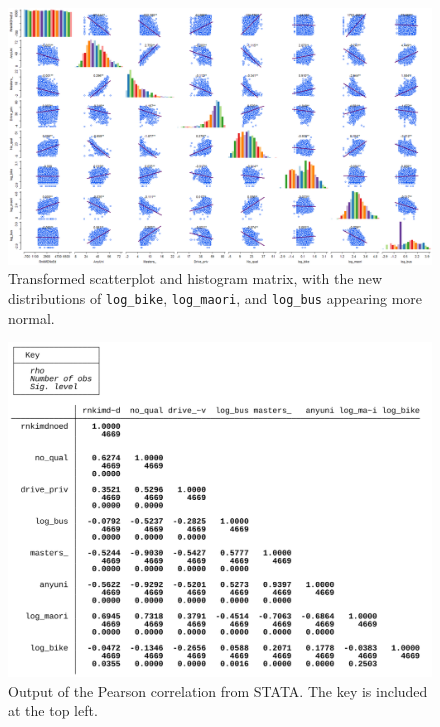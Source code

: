 \documentclass[
  letterpaper,
  DIV=11,
  numbers=noendperiod,
  oneside]{scrartcl}
\begin{document}
\begin{figure}

{\centering \includegraphics{scattermatrix_transformed.png}

}

\caption{\label{fig-transform}Transformed scatterplot and histogram
matrix, with the new distributions of \texttt{log\_bike},
\texttt{log\_maori}, and \texttt{log\_bus} appearing more normal.}

\end{figure}


\begin{figure}

{\centering \includegraphics{Screenshot from 2023-04-20 06-24-16.png}

}

\caption{\label{fig-spearmancorr}Output of the Pearson correlation from
STATA. The key is included at the top left.}

\end{figure}
\end{document}
